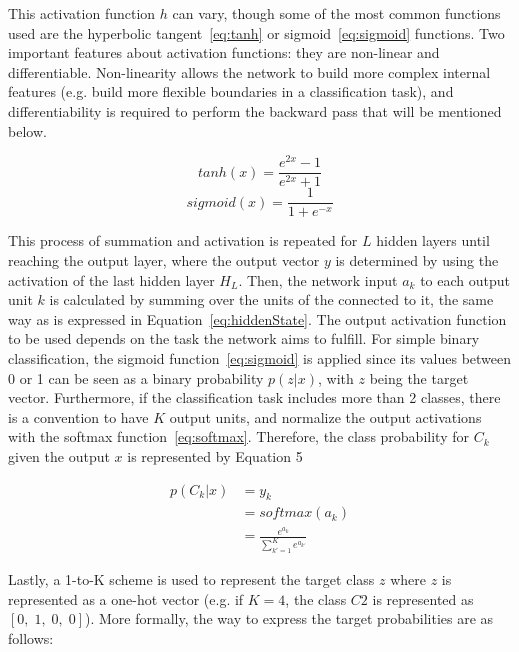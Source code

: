 This activation function $h$ can vary, though some of the most common functions used are the 
hyperbolic tangent~\ref{eq:tanh} or sigmoid~\ref{eq:sigmoid} functions. Two important features 
about activation functions: they are non-linear and differentiable. Non-linearity allows the 
network to build more complex internal features (e.g. build more flexible boundaries in a 
classification task), and differentiability is required to perform the backward pass that 
will be mentioned below.

\begin{equation} \label{eq:tanh}
    tanh(x) = \frac{e^{2x}-1}{e^{2x}+1}
\end{equation}
\begin{equation} \label{eq:sigmoid}
    sigmoid(x) = \frac{1}{1+e^{-x}}
\end{equation}

This process of summation and activation is repeated for $L$ hidden layers until reaching the 
output layer, where the output vector $y$ is determined by using the activation of the last 
hidden layer $H_L$. Then, the network input $a_k$ to each output unit $k$ is calculated by 
summing over the units of the connected to it, the same way as is expressed in Equation~\ref{eq:hiddenState}. 
The output activation function to be used depends on the task the network aims to fulfill. 
For simple binary classification, the sigmoid function~\ref{eq:sigmoid} is applied since its 
values between 0 or 1 can be seen as a binary probability $p(z|x)$, with $z$ being the target 
vector. Furthermore, if the classification task includes more than 2 classes, there is a 
convention to have $K$ output units, and normalize the output activations with the softmax 
function~\ref{eq:softmax}. Therefore, the class probability for $C_k$ given the output $x$ is 
represented by Equation 5

\begin{align} \label{eq:softmax}
    p(C_k|x) & = y_k \nonumber \\
        & = softmax(a_k) \nonumber \\ 
        & = \frac{e^{a_k}}{\sum_{k'=1}^K e^{a_{k'}}}
\end{align}

Lastly, a 1-to-K scheme is used to represent the target class $z$ where $z$ is represented as 
a one-hot vector (e.g. if $K=4$, the class $C2$ is represented as $[0, \; 1, \; 0, \; 0]$). 
More formally, the way to express the target probabilities are as follows:

